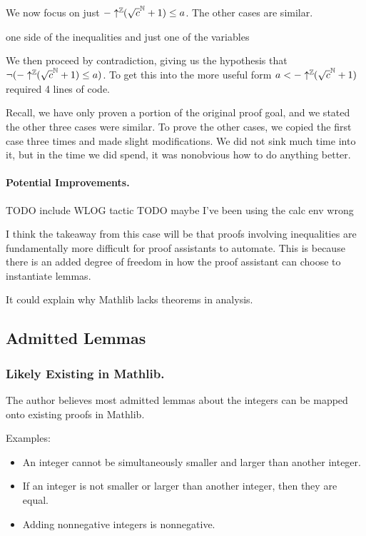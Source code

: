 \documentclass{article}
\begin{document}
We now focus on just $-\uparrow^{\mathbb{Z}}\!\!(\sqrt{c}^{\mathbb{N}} + 1) \leq a$.
The other cases are similar.

 one side of the inequalities and just one of the variables

We then proceed by contradiction, giving us the hypothesis that
$\neg(-\uparrow^{\mathbb{Z}}\!\!(\sqrt{c}^{\mathbb{N}} + 1) \leq a)$.
To get this into the more useful form $a < -\uparrow^{\mathbb{Z}}\!\!(\sqrt{c}^{\mathbb{N}} + 1)$ required 4 lines of code.


Recall, we have only proven a portion of the original proof goal, and we stated the other three cases were similar.
To prove the other cases, we copied the first case three times and made slight modifications.
We did not sink much time into it, but in the time we did spend, it was nonobvious how to do anything better.


\paragraph{Potential Improvements.}
TODO include WLOG tactic
TODO maybe I've been using the calc env wrong


I think the takeaway from this case will be that proofs involving inequalities are fundamentally more difficult for proof assistants to automate.
This is because there is an added degree of freedom in how the proof assistant can choose to instantiate lemmas.

It could explain why Mathlib lacks theorems in analysis.

\subsection{Admitted Lemmas}
\subsubsection{Likely Existing in Mathlib.}
The author believes most admitted lemmas about the integers can be mapped onto existing proofs in Mathlib.

Examples:
\begin{itemize}
  \item An integer cannot be simultaneously smaller and larger than another integer.
  \item If an integer is not smaller or larger than another integer, then they are equal.
  \item Adding nonnegative integers is nonnegative.
\end{itemize}
\end{document}
